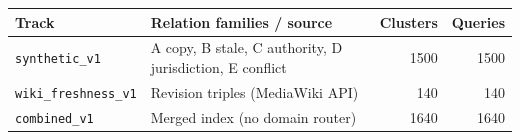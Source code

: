 \begin{tabular}{llrr}
\hline
Track & Relation families / source & Clusters & Queries \\
\hline
\texttt{synthetic\_v1} & A copy, B stale, C authority, D jurisdiction, E conflict & 1500 & 1500 \\
\texttt{wiki\_freshness\_v1} & Revision triples (MediaWiki API) & 140 & 140 \\
\texttt{combined\_v1} & Merged index (no domain router) & 1640 & 1640 \\
\hline
\end{tabular}
